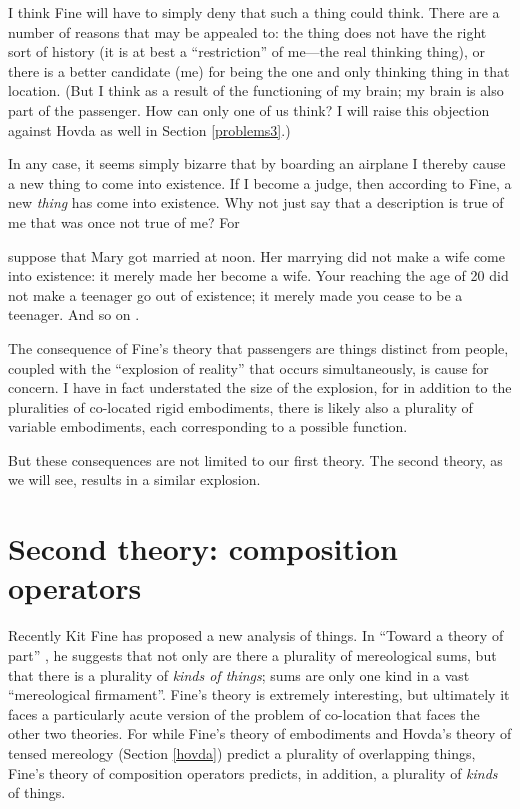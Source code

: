\documentclass[11pt]{article}
\newenvironment{squote}{%
\begin{spacing}{1}
\begin{list}{}{%
\setlength{\labelwidth}{0pt}%
\rightmargin\leftmargin%
}
\item\relax
}{%
\end{list}%
\end{spacing}
}
\begin{document}
\begin{spacing}{1.5}
I think Fine will have to simply deny that such a thing could think.
There are a number of reasons that may be appealed to: the thing does
not have the right sort of history (it is at best a ``restriction'' of
me---the real thinking thing), or there is a better candidate (me) for
being the one and only thinking thing in that location.  (But I think
as a result of the functioning of my brain; my brain is also part of
the passenger.  How can only one of us think?  I will raise this
objection against Hovda as well in Section \ref{problems3}.)

In any case, it seems simply bizarre that by boarding an airplane I
thereby cause a new thing to come into existence.  If I become a
judge, then according to Fine, a new {\em thing} has come into
existence.  Why not just say that a description is true of me that was
once not true of me?  For

\begin{squote}
suppose that Mary got married at noon.  Her marrying did not make a
wife come into existence: it merely made her become a wife.  Your
reaching the age of 20 did not make a teenager go out of existence; it
merely made you cease to be a teenager.  And so on
\citep[151]{thomson1998a}.
\end{squote}

The consequence of Fine's theory that passengers are things distinct
from people, coupled with the ``explosion of reality'' that occurs
simultaneously, is cause for concern.  I have in fact understated the
size of the explosion, for in addition to the pluralities of
co-located rigid embodiments, there is likely also a plurality of
variable embodiments, each corresponding to a possible function.

But these consequences are not limited to our first theory.  The
second theory, as we will see, results in a similar explosion.

\section{Second theory: composition operators}
\label{fine-c}
Recently Kit Fine has proposed a new analysis of things.  In ``Toward
a theory of part'' \citeyearpar{fine2010}, he suggests that not only
are there a plurality of mereological sums, but that there is a
plurality of {\em kinds of things}; sums are only one kind in a vast
``mereological firmament''.  Fine's theory is extremely interesting,
but ultimately it faces a particularly acute version of the problem of
co-location that faces the other two theories.  For while Fine's
theory of embodiments and Hovda's theory of tensed mereology (Section
\ref{hovda}) predict a plurality of overlapping things, Fine's theory
of composition operators predicts, in addition, a plurality of {\em
  kinds} of things.


\end{spacing}
\end{document}
